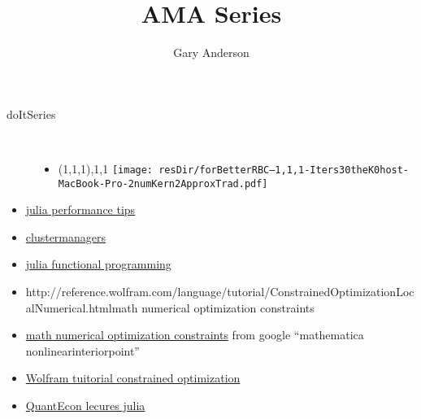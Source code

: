 \documentclass[hyperref]{labbook}
\begin{document}
\frontmatter
\title{AMA Series}
\author{Gary Anderson }
\maketitle

\printindex
\tableofcontents




\mainmatter
{}

\begin{description}
\item[doItSeries] \ 
  \begin{itemize}
  \item (1,1,1),1,1
  \texttt{[image: resDir/forBetterRBC--1,1,1-Iters30theK0host-MacBook-Pro-2numKern2ApproxTrad.pdf]}
  \end{itemize}
\end{description}


\begin{itemize}
\item \href{https://docs.julialang.org/en/stable/manual/performance-tips/}{julia performance tips}
\item \href{https://github.com/JuliaParallel/ClusterManagers.jl}{clustermanagers}
\item \href{https://groups.google.com/forum/?fromgroups=#!topic/julia-dev/21AGMrqbuM0}{julia functional programming}
\end{itemize}



\begin{itemize}
\item {http://reference.wolfram.com/language/tutorial/ConstrainedOptimizationLocalNumerical.html}{math numerical optimization constraints}
\item \href{http://reference.wolfram.com/language/tutorial/ConstrainedOptimizationLocalNumerical.html}{math numerical optimization constraints} from google ``mathematica nonlinearinteriorpoint''
\item \href{http://www.johnboccio.com/MathematicaTutorials/08_ConstrainedOptimization.pdf}{Wolfram tuitorial constrained optimization}
\item \href{https://lectures.quantecon.org/jl/}{QuantEcon lecures julia}
\end{itemize}



\end{document}
